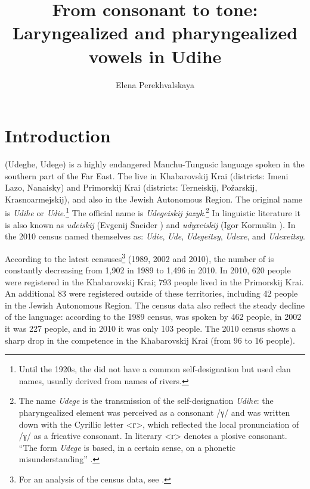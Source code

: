 \documentclass[output=paper,colorlinks,citecolor=brown]{langscibook}
\author{Elena Perekhvalskaya\affiliation{LLACAN CNRS, France}}
\title{From consonant to tone: Laryngealized and pharyngealized vowels in Udihe}
\begin{document}
\maketitle

\section{Introduction}

 (Udeghe, Udege) is a highly endangered Manchu-Tungusic language spoken in the southern part of the  Far East. The  live in Khabarovskij Krai (districts: Imeni Lazo, Nanaisky) and Primorskij Krai (districts: Terneiskij, Požarskij, Krasnoarmejskij), and also in the Jewish Autonomous Region. The original name is \textit{Udihe} or \textit{Udie}.\footnote{Until the 1920s, the  did not have a common self-designation but used clan names, usually derived from names of rivers.} The official  name is \textit{Udegeiskij jazyk}.\footnote{The name \textit{Udege} is the transmission of the self-designation \textit{Udihe}: the pharyngealized element was perceived as a consonant /γ/ and was written down with the Cyrillic letter <г>, which reflected the local  pronunciation of /γ/ as a fricative consonant. In literary  <г> denotes a plosive consonant. “The  form \textit{Udege} is based, in a certain sense, on a phonetic misunderstanding” \citep[5]{Kormushin1998}.} In linguistic literature it is also known as \textit{udeiskij} (Evgenij Šneider \citeyear{Shneider1936}) and \textit{udyxeiskij} (Igor Kormušin \citeyear{Kormushin1998}). In the 2010 census  named themselves as: \textit{Udie}, \textit{Ude}, \textit{Udegeitsy}, \textit{Udexe}, and \textit{Udexeitsy}.

According to the latest censuses\footnote{For an analysis of the census data, see \citet{Perekhvalskaya2016}.} (1989, 2002 and 2010), the number of  is constantly decreasing from 1,902 in 1989 to 1,496 in 2010. In 2010, 620 people were registered in the Khabarovskij Krai; 793 people lived in the Primorskij Krai. An additional 83  were registered outside of these territories, including 42 people in the Jewish Autonomous Region. The census data also reflect the steady decline of the language: according to the 1989 census,  was spoken by 462 people, in 2002 it was 227 people, and in 2010 it was only 103 people. The 2010 census shows a sharp drop in the  competence in the Khabarovskij Krai (from 96 to 16 people).
\end{document}
